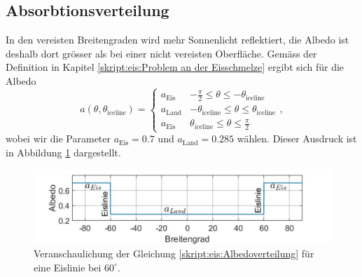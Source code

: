 \begin{refsection}
\subsection{Absorbtionsverteilung}
In den vereisten Breitengraden wird mehr Sonnenlicht reflektiert, die Albedo ist deshalb dort grösser als bei einer nicht vereisten Oberfläche. Gemäss der Definition in Kapitel \ref{skript:eis:Problem an der Eisschmelze} ergibt sich für die Albedo
\begin{equation}\label{skript:eis:Albedoverteilung}
a(\theta,\theta_\text{iceline})
=
\begin{cases}
	a_\text{Eis}&-\tfrac{\pi}{2}\leq\theta\leq-\theta_\text{iceline}\\
	a_\text{Land}&-\theta_\text{iceline}\leq\theta\leq\theta_\text{iceline} \\
	a_\text{Eis}&\theta_\text{iceline}\leq\theta\leq\tfrac{\pi}{2}
\end{cases},
\end{equation}
wobei wir die Parameter $a_\text{Eis}=0.7$ und $a_\text{Land}=0.285$ wählen. Dieser Ausdruck ist in Abbildung \ref{skript:eis:fig:Albedoverteilung} dargestellt.
\begin{figure}
	\centering
	\includegraphics[width=14cm]{eis/Albedo_abh_Breitengrad.jpg}
	\caption{Veranschaulichung der Gleichung \eqref{skript:eis:Albedoverteilung} für eine Eislinie bei $60^\circ$.}
	\label{skript:eis:fig:Albedoverteilung}
\end{figure}

\end{refsection}

